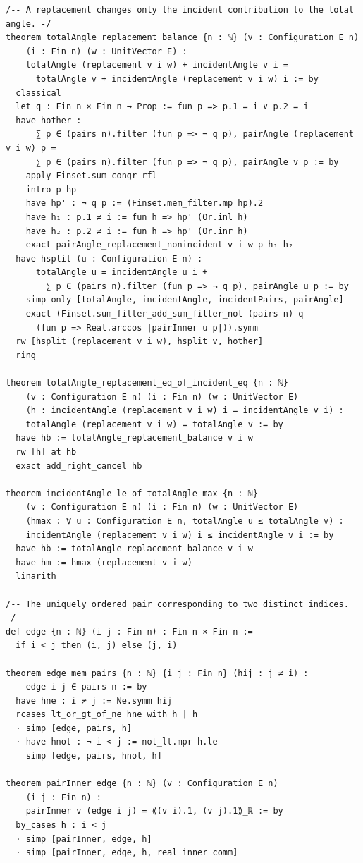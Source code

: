 \documentclass[11pt,a4paper]{article}
\begin{document}
\begin{Verbatim}[breaklines,breakanywhere,fontsize=\footnotesize]
/-- A replacement changes only the incident contribution to the total angle. -/
theorem totalAngle_replacement_balance {n : ℕ} (v : Configuration E n)
    (i : Fin n) (w : UnitVector E) :
    totalAngle (replacement v i w) + incidentAngle v i =
      totalAngle v + incidentAngle (replacement v i w) i := by
  classical
  let q : Fin n × Fin n → Prop := fun p => p.1 = i ∨ p.2 = i
  have hother :
      ∑ p ∈ (pairs n).filter (fun p => ¬ q p), pairAngle (replacement v i w) p =
      ∑ p ∈ (pairs n).filter (fun p => ¬ q p), pairAngle v p := by
    apply Finset.sum_congr rfl
    intro p hp
    have hp' : ¬ q p := (Finset.mem_filter.mp hp).2
    have h₁ : p.1 ≠ i := fun h => hp' (Or.inl h)
    have h₂ : p.2 ≠ i := fun h => hp' (Or.inr h)
    exact pairAngle_replacement_nonincident v i w p h₁ h₂
  have hsplit (u : Configuration E n) :
      totalAngle u = incidentAngle u i +
        ∑ p ∈ (pairs n).filter (fun p => ¬ q p), pairAngle u p := by
    simp only [totalAngle, incidentAngle, incidentPairs, pairAngle]
    exact (Finset.sum_filter_add_sum_filter_not (pairs n) q
      (fun p => Real.arccos |pairInner u p|)).symm
  rw [hsplit (replacement v i w), hsplit v, hother]
  ring

theorem totalAngle_replacement_eq_of_incident_eq {n : ℕ}
    (v : Configuration E n) (i : Fin n) (w : UnitVector E)
    (h : incidentAngle (replacement v i w) i = incidentAngle v i) :
    totalAngle (replacement v i w) = totalAngle v := by
  have hb := totalAngle_replacement_balance v i w
  rw [h] at hb
  exact add_right_cancel hb

theorem incidentAngle_le_of_totalAngle_max {n : ℕ}
    (v : Configuration E n) (i : Fin n) (w : UnitVector E)
    (hmax : ∀ u : Configuration E n, totalAngle u ≤ totalAngle v) :
    incidentAngle (replacement v i w) i ≤ incidentAngle v i := by
  have hb := totalAngle_replacement_balance v i w
  have hm := hmax (replacement v i w)
  linarith

/-- The uniquely ordered pair corresponding to two distinct indices. -/
def edge {n : ℕ} (i j : Fin n) : Fin n × Fin n :=
  if i < j then (i, j) else (j, i)

theorem edge_mem_pairs {n : ℕ} {i j : Fin n} (hij : j ≠ i) :
    edge i j ∈ pairs n := by
  have hne : i ≠ j := Ne.symm hij
  rcases lt_or_gt_of_ne hne with h | h
  · simp [edge, pairs, h]
  · have hnot : ¬ i < j := not_lt.mpr h.le
    simp [edge, pairs, hnot, h]

theorem pairInner_edge {n : ℕ} (v : Configuration E n)
    (i j : Fin n) :
    pairInner v (edge i j) = ⟪(v i).1, (v j).1⟫_ℝ := by
  by_cases h : i < j
  · simp [pairInner, edge, h]
  · simp [pairInner, edge, h, real_inner_comm]


\end{Verbatim}
\end{document}
